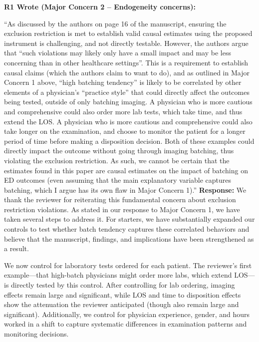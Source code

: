 \documentclass[11pt]{article}
\newenvironment{quote2}
{ \bigskip
\noindent
         \small\em
         \baselineskip=14pt
}
\newcommand{\1}{\hbox{\rm 1\kern-.35em 1}}
\begin{document}
\begin{quote2}
\textbf{R1 Wrote (Major Concern 2 – Endogeneity concerns):}  

\noindent ``As discussed by the authors on page 16 of the manuscript, ensuring the exclusion restriction is met to establish valid causal estimates using the proposed instrument is challenging, and not directly testable. However, the authors argue that ``such violations may likely only have a small impact and may be less concerning than in other healthcare settings''. This is a requirement to establish causal claims (which the authors claim to want to do), and as outlined in Major Concern 1 above, ``high batching tendency'' is likely to be correlated by other elements of a physician’s ``practice style'' that could directly affect the outcomes being tested, outside of only batching imaging. A physician who is more cautious and comprehensive could also order more lab tests, which take time, and thus extend the LOS. A physician who is more cautious and comprehensive could also take longer on the examination, and choose to monitor the patient for a longer period of time before making a disposition decision. Both of these examples could directly impact the outcome without going through imaging batching, thus violating the exclusion restriction. As such, we cannot be certain that the estimates found in this paper are causal estimates on the impact of batching on ED outcomes (even assuming that the main explanatory variable captures batching, which I argue has its own flaw in Major Concern 1).'' 
\end{quote2}


\noindent\textbf{Response:} \color{blue} We thank the reviewer for reiterating this fundamental concern about exclusion restriction violations. As stated in our response to Major Concern 1, we have taken several steps to address it. For starters, we have substantially expanded our controls to test whether batch tendency captures these correlated behaviors and believe that the manuscript, findings, and implications have been strengthened as a result.

We now control for laboratory tests ordered for each patient. The reviewer's first example---that high-batch physicians might order more labs, which extend LOS---is directly tested by this control. After controlling for lab ordering, imaging effects remain large and significant, while LOS and time to disposition effects show the attenuation the reviewer anticipated (though also remain large and significant). Additionally, we control for physician experience, gender, and hours worked in a shift to capture systematic differences in examination patterns and monitoring decisions.
\end{document}
